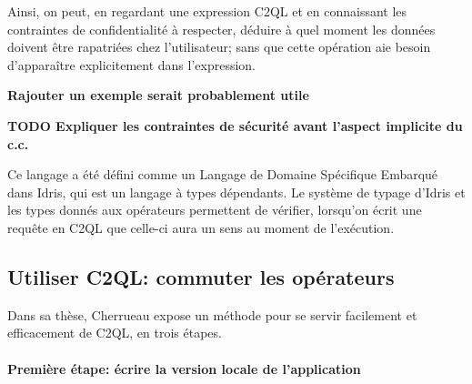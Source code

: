 Ainsi, on peut, en regardant une expression C2QL et en connaissant les
contraintes de confidentialité à respecter,
déduire à quel moment les données doivent être rapatriées chez l'utilisateur;
sans que cette opération aie besoin d'apparaître explicitement dans l'expression.

\textbf{Rajouter un exemple serait probablement utile}

\textbf{TODO Expliquer les contraintes de sécurité avant l'aspect implicite
	du c.c.}

Ce langage a été défini comme un Langage de Domaine Spécifique Embarqué dans
Idris, qui est un langage à types dépendants.
Le système de typage d'Idris et les types donnés aux opérateurs permettent
de vérifier, lorsqu'on écrit une requête en C2QL que celle-ci aura un sens
au moment de l'exécution.

\subsection{Utiliser C2QL: commuter les opérateurs}
Dans sa thèse, Cherrueau expose un méthode pour se servir facilement
et efficacement de C2QL, en trois étapes.

\paragraph{Première étape: écrire la version locale de l'application}

